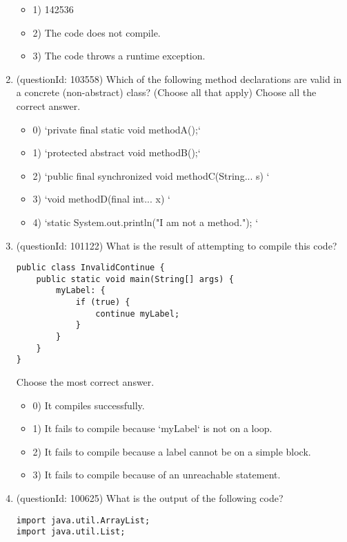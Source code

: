 \documentclass[12pt]{article}
\begin{document}
\begin{enumerate}[label=(\arabic*)]
\begin{itemize}
\item 1) 142536

\item 2) The code does not compile.

\item 3) The code throws a runtime exception.

\end{itemize}
\item (questionId: 103558) Which of the following method declarations are valid in a concrete (non-abstract) class? (Choose all that apply)
Choose all the correct answer.\begin{itemize}
\item 0) `private final static void methodA();`

\item 1) `protected abstract void methodB();`

\item 2) `public final synchronized void methodC(String... s) {}`

\item 3) `void methodD(final int... x) {}`

\item 4) `static { System.out.println("I am not a method."); }`

\end{itemize}
\item (questionId: 101122) What is the result of attempting to compile this code?\n\begin{verbatim}
public class InvalidContinue {
    public static void main(String[] args) {
        myLabel: {
            if (true) {
                continue myLabel; 
            }
        }
    }
}
\end{verbatim}
Choose the most correct answer. 
\begin{itemize}
\item 0) It compiles successfully.

\item 1) It fails to compile because `myLabel` is not on a loop.

\item 2) It fails to compile because a label cannot be on a simple block.

\item 3) It fails to compile because of an unreachable statement.

\end{itemize}
\item (questionId: 100625) What is the output of the following code?\n\begin{verbatim}
import java.util.ArrayList;
import java.util.List;


\end{verbatim}
\end{enumerate}
\end{document}
